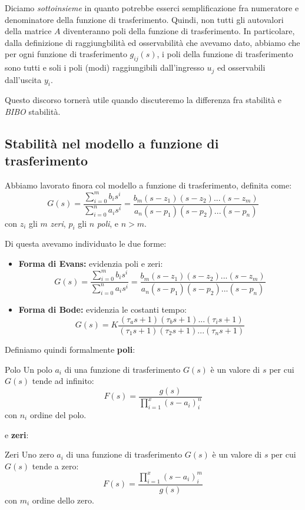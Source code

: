 \documentclass[a4paper,11pt]{article}
\begin{document}
Diciamo \textit{sottoinsieme} in quanto potrebbe esserci semplificazione fra numeratore e denominatore della funzione di trasferimento.
Quindi, non tutti gli autovalori della matrice $A$ diventeranno poli della funzione di trasferimento.
In particolare, dalla definizione di raggiungbilità ed osservabilità che avevamo dato, abbiamo che per ogni funzione di trasferimento $g_{ij}(s)$, i poli della funzione di trasferimento sono tutti e soli i poli (modi) raggiungibili dall'ingresso $u_j$ ed osservabili dall'uscita $y_i$.

Questo discorso tornerà utile quando discuteremo la differenza fra stabilità e \textit{BIBO} stabilità.

\subsection{Stabilità nel modello a funzione di trasferimento}
Abbiamo lavorato finora col modello a funzione di trasferimento, definita come:
$$
G(s) = \frac{\sum_{i = 0}^m b_i s^i}{\sum_{i = 0}^n a_i s^i} = \frac{ b_m (s - z_1) (s - z_2) ... (s - z_m) }{ a_n (s - p_1) (s - p_2) ... (s - p_n) }
$$
con $z_i$ gli $m$ \textit{zeri}, $p_i$ gli $n$ \textit{poli}, e $n > m$.

Di questa avevamo individuato le due forme:
\begin{itemize}
	\item \textbf{Forma di Evans:} evidenzia poli e zeri:
		$$
G(s) = \frac{\sum_{i = 0}^m b_i s^i}{\sum_{i = 0}^n a_i s^i} = \frac{ b_m (s - z_1) (s - z_2) ... (s - z_m) }{ a_n (s - p_1) (s - p_2) ... (s - p_n) }
		$$
	\item \textbf{Forma di Bode:} evidenzia le costanti tempo: 
		$$
G(s) = K \frac{ (\tau_a s + 1) (\tau_b s + 1) ... (\tau_i s + 1) }{ (\tau_1 s + 1) (\tau_2 s + 1) ... (\tau_n s + 1) }
		$$
\end{itemize}

Definiamo quindi formalmente \textbf{poli}:
\begin{definition}{Polo}
	Un polo $a_i$ di una funzione di trasferimento $G(s)$ è un valore di $s$ per cui $G(s)$ tende ad infinito:
	$$
	F(s) = \frac{g(s)}{\prod_{i = 1}^x (s - a_i)^n_i}
	$$
	con $n_i$ ordine del polo.
\end{definition}
e \textbf{zeri}:
\begin{definition}{Zeri}
	Uno zero $a_i$ di una funzione di trasferimento $G(s)$ è un valore di $s$ per cui $G(s)$ tende a zero: 
	$$
	F(s) = \frac{\prod_{i = 1}^x (s - a_i)^m_i}{g(s)}
	$$
	con $m_i$ ordine dello zero.
\end{definition}
\end{document}
